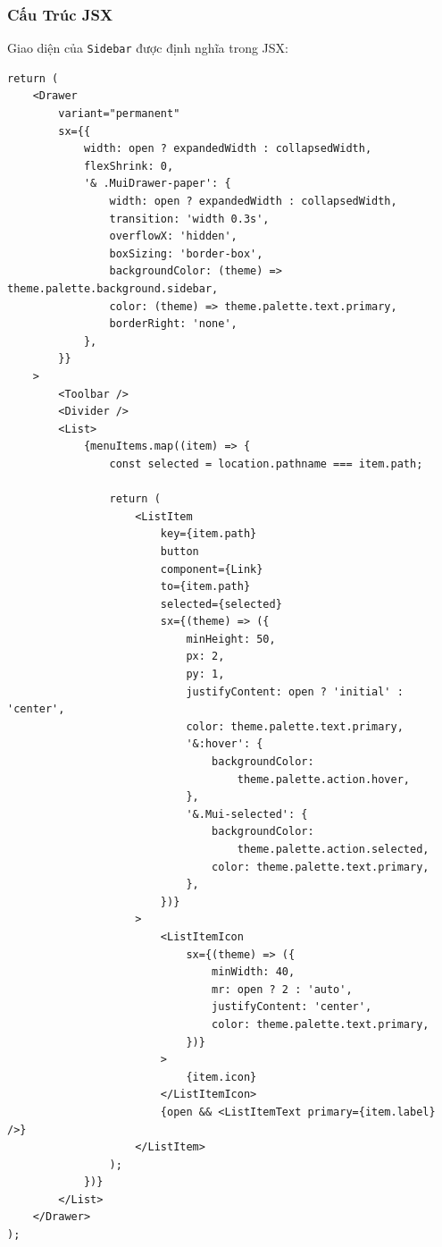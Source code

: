            \subsubsection{Cấu Trúc JSX}
                \hspace*{0.6cm}Giao diện của \texttt{Sidebar} được định nghĩa trong JSX:
                \begin{lstlisting}
return (
    <Drawer
        variant="permanent"
        sx={{
            width: open ? expandedWidth : collapsedWidth,
            flexShrink: 0,
            '& .MuiDrawer-paper': {
                width: open ? expandedWidth : collapsedWidth,
                transition: 'width 0.3s',
                overflowX: 'hidden',
                boxSizing: 'border-box',
                backgroundColor: (theme) => theme.palette.background.sidebar,
                color: (theme) => theme.palette.text.primary,
                borderRight: 'none',
            },
        }}
    >
        <Toolbar />
        <Divider />
        <List>
            {menuItems.map((item) => {
                const selected = location.pathname === item.path;

                return (
                    <ListItem
                        key={item.path}
                        button
                        component={Link}
                        to={item.path}
                        selected={selected}
                        sx={(theme) => ({
                            minHeight: 50,
                            px: 2,
                            py: 1,
                            justifyContent: open ? 'initial' : 'center',
                            color: theme.palette.text.primary,
                            '&:hover': {
                                backgroundColor:
                                    theme.palette.action.hover,
                            },
                            '&.Mui-selected': {
                                backgroundColor:
                                    theme.palette.action.selected,
                                color: theme.palette.text.primary,
                            },
                        })}
                    >
                        <ListItemIcon
                            sx={(theme) => ({
                                minWidth: 40,
                                mr: open ? 2 : 'auto',
                                justifyContent: 'center',
                                color: theme.palette.text.primary,
                            })}
                        >
                            {item.icon}
                        </ListItemIcon>
                        {open && <ListItemText primary={item.label} />}
                    </ListItem>
                );
            })}
        </List>
    </Drawer>
);
                \end{lstlisting}
